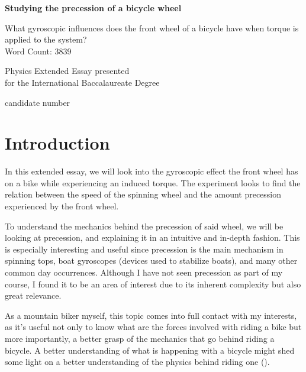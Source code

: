 \documentclass{article}
\begin{document}
\begin{titlepage}
    \begin{center}
    \vspace*{1cm}
        
        \textbf{Studying the precession of a bicycle wheel}
        
        \vspace{0.5cm}
        What gyroscopic influences does the front wheel of a bicycle have when torque is applied to the system?\\
        \vspace{1.5cm}
        Word Count: 3839
        \vfill
        
        Physics Extended Essay presented\\
        for the International Baccalaureate Degree
        
        \vspace{0.8cm}
        
        candidate number
        
    \end{center}
\end{titlepage}

\tableofcontents
\pagebreak
\section{Introduction}

In this extended essay, we will look into the gyroscopic effect the front wheel has on a bike while experiencing an induced torque. The experiment looks to find the relation between the speed of the spinning wheel and the amount precession experienced by the front wheel.

To understand the mechanics behind the precession of said wheel, we will be looking at precession, and explaining it in an intuitive and in-depth fashion. This is especially interesting and useful since precession is the main mechanism in spinning tops, boat gyroscopes (devices used to stabilize boats), and many other common day occurrences. Although I have not seen precession as part of my course, I found it to be an area of interest due to its inherent complexity but also great relevance.

As a mountain biker myself, this topic comes into full contact with my interests, as it's useful not only to know what are the forces involved with riding a bike but more importantly, a better grasp of the mechanics that go behind riding a bicycle. A better understanding of what is happening with a bicycle might shed some light on a better understanding of the physics behind riding one (\cite{hubbard2011human,kooijman2006experimental,meijaard2007linearized}).
\end{document}
